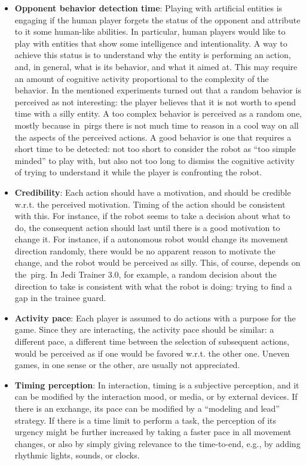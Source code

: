 \begin{itemize}
\item \textbf{Opponent behavior detection time}: Playing with artificial entities is engaging if the human player forgets the status of the opponent and attribute to it some human-like abilities. In particular, human players would like to play with entities that show some intelligence and intentionality. A way to achieve this status is to understand why the entity is performing an action, and, in general, what is its behavior, and what it aimed at. This may require an amount of cognitive activity proportional to the complexity of the behavior. In the mentioned experiments turned out that a random behavior is perceived as not interesting: the player believes that it is not worth to spend time with a silly entity. A too complex behavior is perceived as a random one, mostly because in~\gls{pirg}s there is not much time to reason in a cool way on all the aspects of the perceived actions. A good behavior is one that requires a short time to be detected: not too short to consider the robot as ``too simple minded'' to play with, but also not too long to dismiss the cognitive activity of trying to understand it while the player is confronting the robot.

\item \textbf{Credibility}: Each action should have a motivation, and should be credible w.r.t. the perceived motivation. Timing of the action should be consistent with this. For instance, if the robot seems to take a decision about what to do, the consequent action should last until there is a good motivation to change it. For instance, if a autonomous robot would change its movement direction randomly, there would be no apparent reason to motivate the change, and the robot would be perceived as silly. This, of course, depends on the~\gls{pirg}. In Jedi Trainer 3.0, for example, a random decision about the direction to take is consistent with what the robot is doing: trying to find a gap in the trainee guard.

\item \textbf{Activity pace}: Each player is assumed to do actions with a purpose for the game. Since they are interacting, the activity pace should be similar: a different pace, a different time between the selection of subsequent actions, would be perceived as if one would be favored w.r.t. the other one. Uneven games, in one sense or the other, are usually not appreciated.

\item \textbf{Timing perception}: In interaction, timing is a subjective perception, and it can be modified by the interaction mood, or media, or by external devices. If there is an exchange, its pace can be modified by a ``modeling and lead'' strategy. If there is a time limit to perform a task, the perception of its urgency might be further increased by taking a faster pace in all movement changes, or also by simply giving relevance to the time-to-end, e.g., by adding rhythmic lights, sounds, or clocks.
\end{itemize}

